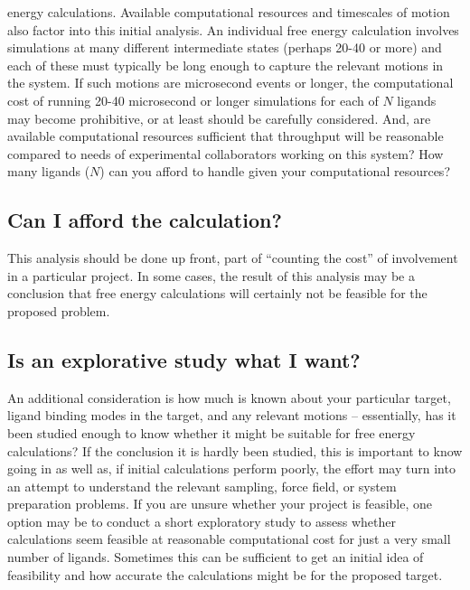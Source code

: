 \documentclass[9pt,bestpractices]{livecoms}
\begin{document}
energy calculations.
%  
Available computational resources and timescales of motion also factor
into this initial analysis. An individual free energy calculation
involves simulations at many different intermediate states (perhaps
20-40 or more) and each of these must typically be long enough to
capture the relevant motions in the system. If such motions are
microsecond events or longer, the computational cost of running 20-40
microsecond or longer simulations for each of $N$ ligands may become
prohibitive, or at least should be carefully considered. And, are
available computational resources sufficient that throughput will be
reasonable compared to needs of experimental collaborators working on
this system? How many ligands ($N$) can you afford to handle given
your computational resources?
%
\subsection*{Can I afford the calculation?}
This analysis should be done up front, part of ``counting the cost''
of involvement in a particular project. In some cases, the result of
this analysis may be a conclusion that free energy calculations will
certainly not be feasible for the proposed problem.
%
\subsection*{Is an explorative study what I want?}
An additional consideration is how much is known about your particular
target, ligand binding modes in the target, and any relevant motions
-- essentially, has it been studied enough to know whether it might be
suitable for free energy calculations? If the conclusion it is hardly
been studied, this is important to know going in as well as, if
initial calculations perform poorly, the effort may turn into an
attempt to understand the relevant sampling, force field, or system
preparation problems.
%
If you are unsure whether your project is feasible, one option may be
to conduct a short exploratory study to assess whether calculations
seem feasible at reasonable computational cost for just a very small
number of ligands. Sometimes this can be sufficient to get an initial
idea of feasibility and how accurate the calculations might be for the
proposed target.
\end{document}
